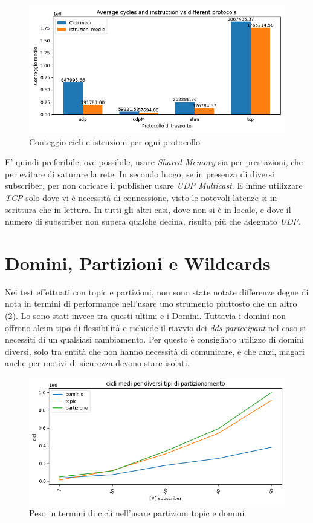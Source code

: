 \begin{figure}[H]
    \includegraphics[width=\textwidth]{./results/test1_cyclinstr.png} 
        \caption{Conteggio cicli e istruzioni per ogni protocollo}
        \label{fig:test3_different_protocols}
\end{figure}
E' quindi preferibile, ove possibile, usare \emph{Shared Memory} sia per prestazioni, che per evitare di saturare la rete. In secondo luogo, se in presenza di diversi subscriber, per non caricare il publisher usare \emph{UDP Multicast}. E infine utilizzare \emph{TCP} solo dove vi è necessità di connessione, visto le notevoli latenze si in scrittura che in lettura. In tutti gli altri casi, dove non si è in locale, e dove il numero di subscriber non supera qualche decina, risulta più che adeguato \emph{UDP}.

\section{Domini, Partizioni e Wildcards}
Nei test effettuati con topic e partizioni, non sono state notate differenze degne di nota in termini di performance nell'usare uno strumento piuttosto che un altro (\ref{fig:test2parttopicdomain}). Lo sono stati invece tra questi ultimi e i Domini. Tuttavia i domini non offrono alcun tipo di flessibilità e richiede il riavvio dei \emph{dds-partecipant} nel caso si necessiti di un qualsiasi cambiamento. Per questo è consigliato utilizzo di domini diversi, solo tra entità che non hanno necessità di comunicare, e che anzi, magari anche per motivi di sicurezza devono stare isolati. 


\begin{figure}[H]
    \includegraphics[width=\textwidth]{./results/test2_cicli_partvstopicvsdomaain.png} 
        \caption{Peso in termini di cicli nell'usare partizioni topic e domini}
        \label{fig:test2parttopicdomain}
\end{figure}

